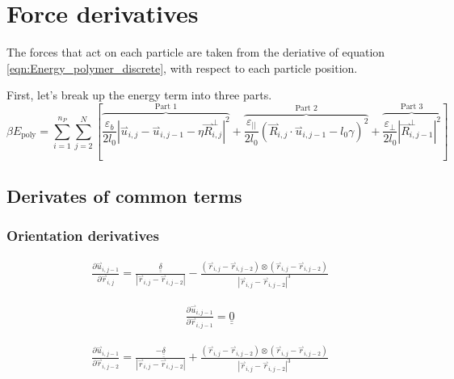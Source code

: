 \documentclass{article}
\renewcommand{\ij}{_{i,j}}
\newcommand{\ijj}{_{i,j-1}}
\newcommand{\ijk}{_{i,j-2}}
\newcommand{\ijjj}{_{i,j-2}}
\newcommand{\magn}[1]{\left\vert #1 \right\vert }
\renewcommand{\part}[2]{\frac{\partial #1 }{\partial #2}}
\newcommand{\harp}{\overset{\rightharpoonup}}
\newcommand{\ten}[1]{\underline{\underline{#1}}}
\newcommand{\rij}{\harp r \ij}
\newcommand{\rijjj}{\harp r \ijjj}
\newcommand{\rijk}{\harp r \ijk}
\begin{document}
\section{Force derivatives}

The forces that act on each particle are taken from the deriative of equation
\ref{eqn:Energy_polymer_discrete}, with respect to each particle position.

First, let's break up the energy term into three parts.
\begin{equation}
  \label{eqn:Energy_polymer_broken}
  \beta E_{\text{poly}}  =  \sum_{i=1}^{n_P}  \sum_{j=2}^{N} \left[
  \overbrace{\frac{\varepsilon_b}{2 l_0}  
  \magn{ \harp u \ij - \harp u \ijj - \eta \harp R\ij ^\bot} ^2}^{\text{Part 1}} 
  +
  \overbrace{
   \frac{\varepsilon_{\vert \vert}}{2 l_0} 
   \left( \harp R\ij \cdot \harp u \ijj - l_0 \gamma \right)^2 }
   ^{\text{Part 2}}
   +
   \overbrace{\frac{\varepsilon _\perp}
   {2l_0} \magn{\harp R\ijj ^\perp}^2} ^ {\text{Part 3}}
  \right]
\end{equation}

\subsection{Derivates of common terms}
\subsubsection{Orientation derivatives}

\begin{align*}
  \part{\harp u \ijj }{\harp r \ij} = \frac{\ten{\delta }}{\magn{\harp r \ij - \harp r \ijjj}} - 
  \frac{
    \left(\rij - \rijk \right)\otimes 
  \left(\rij - \rijk \right)
  }{
    \magn{\rij - \rijjj } ^3
    }
\end{align*}


\begin{align*}
  \part{\harp u \ijj }{\harp r \ijj} = \ten{0}
\end{align*}


\begin{align*}
  \part{\harp u \ijj }{\harp r \ijk} =   \frac{-\ten{\delta }}{\magn{\harp r \ij - \harp r \ijjj}} 
  +
  \frac{
    \left(\rij - \rijk \right)\otimes 
  \left(\rij - \rijk \right)
  }{
    \magn{\rij - \rijjj } ^3
    }
\end{align*}
\end{document}

